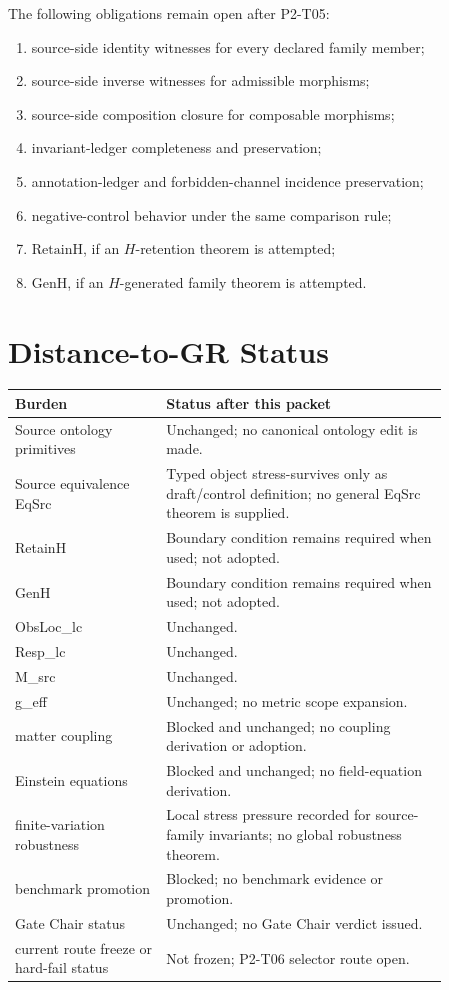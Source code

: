 \documentclass[11pt]{article}
\newcommand{\RetainH}{\mathrm{RetainH}}
\newcommand{\GenH}{\mathrm{GenH}}
\begin{document}
The following obligations remain open after P2-T05:

\begin{enumerate}[leftmargin=*]
  \item source-side identity witnesses for every declared family member;
  \item source-side inverse witnesses for admissible morphisms;
  \item source-side composition closure for composable morphisms;
  \item invariant-ledger completeness and preservation;
  \item annotation-ledger and forbidden-channel incidence preservation;
  \item negative-control behavior under the same comparison rule;
  \item \(\RetainH\), if an \(H\)-retention theorem is attempted;
  \item \(\GenH\), if an \(H\)-generated family theorem is attempted.
\end{enumerate}

\section{Distance-to-GR Status}

\begin{longtable}{p{0.30\linewidth}p{0.56\linewidth}}
\toprule
Burden & Status after this packet \\
\midrule
Source ontology primitives & Unchanged; no canonical ontology edit is made. \\
Source equivalence EqSrc & Typed object stress-survives only as draft/control definition; no general EqSrc theorem is supplied. \\
RetainH & Boundary condition remains required when used; not adopted. \\
GenH & Boundary condition remains required when used; not adopted. \\
ObsLoc\_lc & Unchanged. \\
Resp\_lc & Unchanged. \\
M\_src & Unchanged. \\
g\_eff & Unchanged; no metric scope expansion. \\
matter coupling & Blocked and unchanged; no coupling derivation or adoption. \\
Einstein equations & Blocked and unchanged; no field-equation derivation. \\
finite-variation robustness & Local stress pressure recorded for source-family invariants; no global robustness theorem. \\
benchmark promotion & Blocked; no benchmark evidence or promotion. \\
Gate Chair status & Unchanged; no Gate Chair verdict issued. \\
current route freeze or hard-fail status & Not frozen; P2-T06 selector route open. \\
\bottomrule
\end{longtable}
\end{document}
